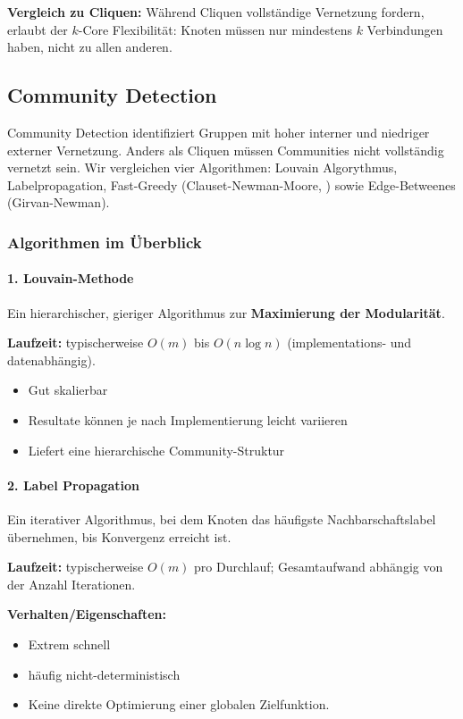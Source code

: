 \textbf{Vergleich zu Cliquen:} Während Cliquen vollständige Vernetzung fordern, erlaubt der $k$-Core Flexibilität: Knoten müssen nur mindestens $k$ Verbindungen haben, nicht zu allen anderen.

\subsection{Community Detection}

Community Detection identifiziert Gruppen mit hoher interner und niedriger externer Vernetzung. Anders als Cliquen müssen Communities nicht vollständig vernetzt sein. Wir vergleichen vier Algorithmen: Louvain Algorythmus, Labelpropagation, Fast-Greedy (Clauset-Newman-Moore, \cite{Clauset_2004}) sowie Edge-Betweenes (Girvan-Newman).

\subsubsection{Algorithmen im Überblick}

\paragraph{1. Louvain-Methode}
Ein hierarchischer, gieriger Algorithmus zur \textbf{Maximierung der Modularität}.

\textbf{Laufzeit:} typischerweise $O(m)$ bis $O(n \log n)$ (implementations- und datenabhängig).

\begin{itemize}
  \item Gut skalierbar
  \item Resultate können je nach Implementierung leicht variieren
  \item Liefert eine hierarchische Community-Struktur
\end{itemize}

\paragraph{2. Label Propagation}
Ein iterativer Algorithmus, bei dem Knoten das häufigste Nachbarschaftslabel übernehmen, bis Konvergenz erreicht ist.

\textbf{Laufzeit:} typischerweise $O(m)$ pro Durchlauf; Gesamtaufwand abhängig von der Anzahl Iterationen.

\textbf{Verhalten/Eigenschaften:}
\begin{itemize}
  \item Extrem schnell
  \item häufig nicht-deterministisch
  \item Keine direkte Optimierung einer globalen Zielfunktion.
\end{itemize}

